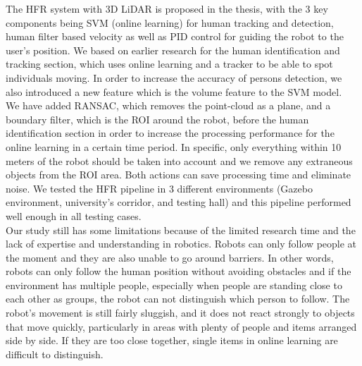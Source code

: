 The HFR system with 3D LiDAR is proposed in the thesis, with the 3 key components 
being SVM (online learning) for human tracking and detection, human filter based velocity as well as 
PID control for guiding the robot to the user's position.
We based on earlier research for the human identification and tracking section, 
which uses online learning and a tracker to be able to spot individuals moving. 
In order to increase the accuracy of persons detection, we also introduced a new 
feature which is the volume feature to the SVM model.\\

We have added RANSAC, which removes the point-cloud as a plane, and a boundary filter, 
which is the ROI around the robot, before the human identification section in 
order to increase the processing performance for the online learning in a certain time 
period. In specific, only everything within 10 meters of the robot should be taken into account and we
remove any extraneous objects from the ROI area. Both actions can save processing time and 
eliminate noise. We tested the HFR pipeline in 3 different
environments (Gazebo environment, university's corridor, and testing hall) and this
pipeline performed well enough in all testing cases.\\






Our study still has some limitations because of the limited research time 
and the lack of expertise and understanding in robotics. Robots can only follow 
people at the moment and they are also unable to go around barriers. In other words, 
robots can only follow the human position without avoiding obstacles and if the environment has multiple people, especially when people are standing
close to each other as groups, the robot can not distinguish which person to follow.
The robot's movement is still fairly sluggish, and it does not react strongly 
to objects that move quickly, particularly in areas with plenty of people and 
items arranged side by side. If they are too close together, single items in 
online learning are difficult to distinguish. 

